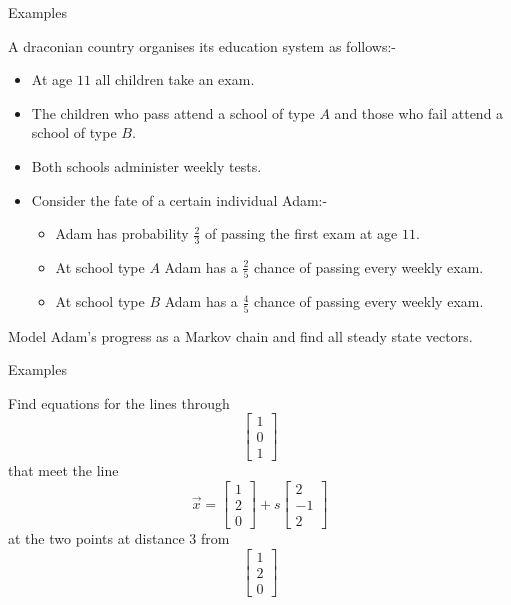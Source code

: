 \documentclass{beamer}
\begin{document}
\begin{frame}{Examples}
\begin{example}
	A draconian country organises its education system as follows:-
	\begin{itemize}
		\item At age $11$ all children take an exam.
		\item The children who pass attend a school of type $A$ and those who fail attend a school of type $B$.
		\item Both schools administer weekly tests.
		\item Consider the fate of a certain individual Adam:-
		\begin{itemize}
			\item Adam has probability $\frac{2}{3}$ of passing the first exam at age $11$.
			\item At school type $A$ Adam has a $\frac{2}{5}$ chance of passing every weekly exam.
			\item At school type $B$ Adam has a $\frac{4}{5}$ chance of passing every weekly exam.
		\end{itemize}
	\end{itemize}
	Model Adam's progress as a Markov chain and find all steady state vectors.
\end{example}
\end{frame}

\begin{frame}{Examples}
\begin{example}
	Find equations for the lines through
	\begin{equation*}
	\left[
	\begin{matrix}
	1\\
	0\\
	1
	\end{matrix}
	\right]
	\end{equation*}
	that meet the line
	\begin{equation*}
	\vec{x} = \left[
	\begin{matrix}
	1\\
	2\\
	0
	\end{matrix}
	\right]+s \left[
	\begin{matrix}
	2\\
	-1\\
	2
	\end{matrix}
	\right]
	\end{equation*}
	at the two points at distance $3$ from 
	\begin{equation*}
	\left[
	\begin{matrix}
	1\\
	2\\
	0
	\end{matrix}
	\right]
	\end{equation*}
\end{example}
\end{frame}
\end{document}
